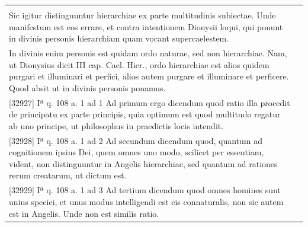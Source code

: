 \documentclass[paper=a4paper,fontsize=10pt,jafontsize=9pt,titlepage]{jlreq}
\begin{document}
\begin{longtable}{p{21em}p{21em}}
&


\\


Sic igitur
distinguuntur hierarchiae ex parte multitudinis subiectae. Unde
manifestum est eos errare, et contra intentionem Dionysii loqui, qui
ponunt in divinis personis hierarchiam quam vocant supercaelestem. 



&


\\


In
divinis enim personis est quidam ordo naturae, sed non
hierarchiae. Nam, ut Dionysius dicit III cap. Cael. Hier., ordo
hierarchiae est alios quidem purgari et illuminari et perfici, alios
autem purgare et illuminare et perficere. Quod absit ut in divinis
personis ponamus.

&


\\


[32927] Iª q. 108 a. 1 ad 1
Ad primum ergo dicendum quod ratio illa procedit de principatu ex
parte principis, quia optimum est quod multitudo regatur ab uno
principe, ut philosophus in praedictis locis intendit.

&


\\


[32928] Iª q. 108 a. 1 ad 2
Ad secundum dicendum quod, quantum ad cognitionem ipsius Dei, quem
omnes uno modo, scilicet per essentiam, vident, non distinguuntur in
Angelis hierarchiae, sed quantum ad rationes rerum creatarum, ut
dictum est.

&


\\


[32929] Iª q. 108 a. 1 ad 3
Ad tertium dicendum quod omnes homines sunt unius speciei, et unus
modus intelligendi est eis connaturalis, non sic autem est in
Angelis. Unde non est similis ratio.

&




\end{longtable}
\newpage
\end{document}
